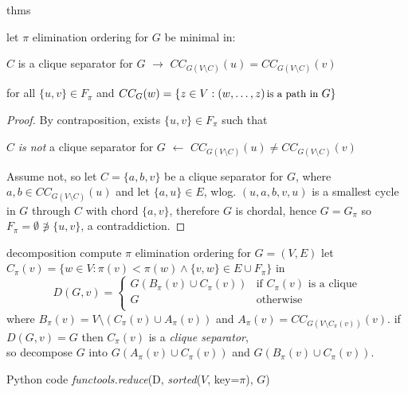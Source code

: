 \documentclass{beamer}
\begin{document}
\begin{frame}{thms}
\begin{theorem}
let $\pi$ elimination ordering for $G$ be minimal in: 
\begin{center}
$C$ is a clique separator for $G$ $\rightarrow$ $CC_{G(V\setminus C)}(u) =
CC_{G(V\setminus C)}(v)$
\end{center}
for all $ \lbrace u, v \rbrace \in F_{\pi}$ and $CC_{G}(w)= \lbrace z\in V:
    (w,\ldots,z) \text{\small\,is a path in } G \rbrace$
\end{theorem}
\begin{proof}
By contraposition, exists $ \lbrace u, v \rbrace\in F_{\pi}$ such that
\begin{center}
$C$ \textit{is not} a clique separator for $G$ $\leftarrow$ $CC_{G(V\setminus C)}(u)\neq 
CC_{G(V\setminus C)}(v)$
\end{center}
Assume not, so let $C= \lbrace a, b, v \rbrace$ be a clique separator for $G$,
where $a, b\in CC_{G(V\setminus C)}(u)$ and let $ \lbrace a, u \rbrace\in E$, wlog.
$(u, a, b, v, u)$ is a smallest cycle in $G$ through $C$ with chord $ \lbrace a, v \rbrace$, 
therefore $G$ is chordal, hence $G=G_{\pi}$ so $F_{\pi}=\emptyset \not\ni \lbrace u, v \rbrace$,
a contraddiction.
\end{proof}
\end{frame}

\begin{frame}{decomposition}
compute $\pi$ elimination ordering for $G=(V, E)$
\vfill
let $C_{\pi}(v) =  \lbrace w \in V : \pi(v) < \pi(w) \wedge  \lbrace v, w \rbrace \in E\cup F_{\pi} \rbrace$ in
$$D(G, v) = \left\lbrace\begin{array}{ll}
            G(B_{\pi}(v)\cup C_{\pi}(v)) & \text{if } C_{\pi}(v) \text{ is a clique}\\
            G & \text{otherwise} \\
           \end{array}\right.$$
where $B_{\pi}(v) = V\setminus \left(C_{\pi}(v)\cup A_{\pi}(v)\right)$
and $A_{\pi}(v) = CC_{G\left(V\setminus C_{\pi}(v)\right)}(v)$.
\vfill
if $D(G, v) = G$ then  $C_{\pi}(v)$ is a \emph{clique separator},\\
so decompose $G$ into $G(A_{\pi}(v) \cup C_{\pi}(v))$ and $G(B_{\pi}(v) \cup C_{\pi}(v))$.
\vfill
\begin{block}{Python code}
\textit{functools.reduce}(D, \textit{sorted}($V$, key=$\pi$), $G$)
\end{block}
\end{frame}
\end{document}
